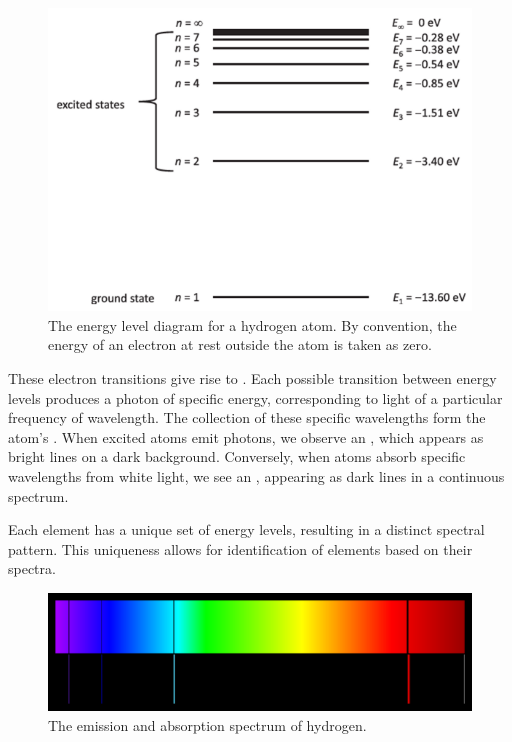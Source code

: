 \begin{figure}[H]
    \centering
    \includegraphics[scale=0.5]{media/Energy Level Diagram.png}
    \caption{The energy level diagram for a hydrogen atom. By convention, the energy of an electron at rest outside the atom is taken as zero.\protect\footnotemark}
\end{figure}

These electron transitions give rise to . Each possible transition between energy levels produces a photon of specific energy, corresponding to light of a particular frequency of wavelength. The collection of these specific wavelengths form the atom's . When excited atoms emit photons, we observe an , which appears as bright lines on a dark background. Conversely, when atoms absorb specific wavelengths from white light, we see an , appearing as dark lines in a continuous spectrum.

Each element has a unique set of energy levels, resulting in a distinct spectral pattern. This uniqueness allows for identification of elements based on their spectra.

\begin{figure}[H]
    \centering
    \includegraphics[scale=0.6]{media/Emission and Absorption Spectrum.png}
    \caption{The emission and absorption spectrum of hydrogen.\protect\footnotemark}
\end{figure}

